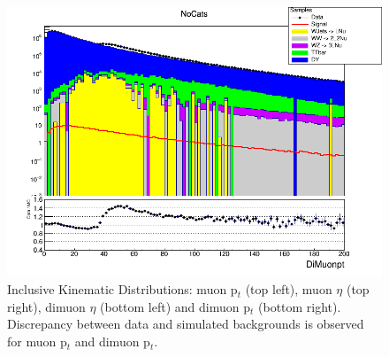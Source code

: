 \begin{figure}[htbp]
    \includegraphics[width=0.45\linewidth]{figures/ch_higgs/distributions/baseline_kalman/distribution__NoCats__DiMuonpt__logY.png}
    \caption{Inclusive Kinematic Distributions: muon p$_t$ (top left), muon $\eta$ (top right), dimuon $\eta$ (bottom left) and dimuon p$_t$ (bottom right). Discrepancy between data and simulated backgrounds is observed for muon p$_t$ and dimuon p$_t$. }
    \label{fig:higgs_selections_inclusivekinematic}
  \end{figure}

